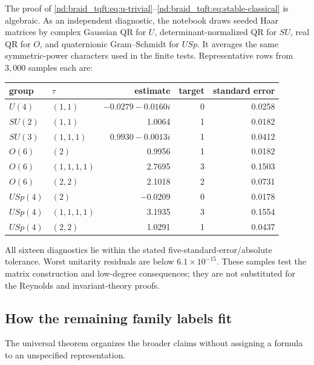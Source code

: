 \documentclass[10pt]{article}
\begin{document}
The proof of \eqref{nd:braid_tqft:eq:u-trivial}--\eqref{nd:braid_tqft:eq:stable-classical} is algebraic.
As an independent diagnostic, the notebook draws seeded Haar matrices by
complex Gaussian QR for $U$, determinant-normalized QR for $SU$, real QR for
$O$, and quaternionic Gram--Schmidt for $USp$.  It averages the same
symmetric-power characters used in the finite tests.  Representative rows
from $3,000$ samples each are:
\begin{center}
\begin{tabular}{@{}llrrr@{}}
\toprule
group&$\tau$&estimate&target&standard error\\
\midrule
$U(4)$&$(1,1)$&$-0.0279-0.0160i$&0&0.0258\\
$SU(2)$&$(1,1)$&1.0064&1&0.0182\\
$SU(3)$&$(1,1,1)$&$0.9930-0.0013i$&1&0.0412\\
$O(6)$&$(2)$&0.9956&1&0.0182\\
$O(6)$&$(1,1,1,1)$&2.7695&3&0.1503\\
$O(6)$&$(2,2)$&2.1018&2&0.0731\\
$USp(4)$&$(2)$&$-0.0209$&0&0.0178\\
$USp(4)$&$(1,1,1,1)$&3.1935&3&0.1554\\
$USp(4)$&$(2,2)$&1.0291&1&0.0437\\
\bottomrule
\end{tabular}
\end{center}
All sixteen diagnostics lie within the stated five-standard-error/absolute
tolerance.  Worst unitarity residuals are below $6.1\times10^{-15}$.  These
samples test the matrix construction and low-degree consequences; they are
not substituted for the Reynolds and invariant-theory proofs.

\subsection{How the remaining family labels fit}

The universal theorem organizes the broader claims without assigning a
formula to an unspecified representation.
\end{document}
